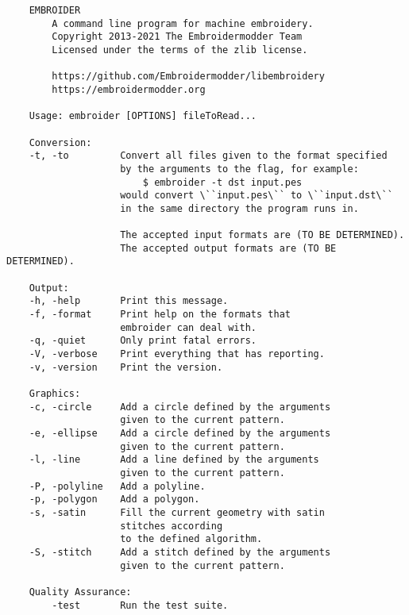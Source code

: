 
\begin{verbatim}
    EMBROIDER
        A command line program for machine embroidery.
        Copyright 2013-2021 The Embroidermodder Team
        Licensed under the terms of the zlib license.

        https://github.com/Embroidermodder/libembroidery
        https://embroidermodder.org

    Usage: embroider [OPTIONS] fileToRead...

    Conversion:
    -t, -to         Convert all files given to the format specified
                    by the arguments to the flag, for example:
                        $ embroider -t dst input.pes
                    would convert \``input.pes\`` to \``input.dst\``
                    in the same directory the program runs in.

                    The accepted input formats are (TO BE DETERMINED).
                    The accepted output formats are (TO BE DETERMINED).

    Output:
    -h, -help       Print this message.
    -f, -format     Print help on the formats that
                    embroider can deal with.
    -q, -quiet      Only print fatal errors.
    -V, -verbose    Print everything that has reporting.
    -v, -version    Print the version.

    Graphics:
    -c, -circle     Add a circle defined by the arguments
                    given to the current pattern.
    -e, -ellipse    Add a circle defined by the arguments
                    given to the current pattern.
    -l, -line       Add a line defined by the arguments
                    given to the current pattern.
    -P, -polyline   Add a polyline.
    -p, -polygon    Add a polygon.
    -s, -satin      Fill the current geometry with satin
                    stitches according
                    to the defined algorithm.
    -S, -stitch     Add a stitch defined by the arguments
                    given to the current pattern.

    Quality Assurance:
        -test       Run the test suite.
\end{verbatim}
